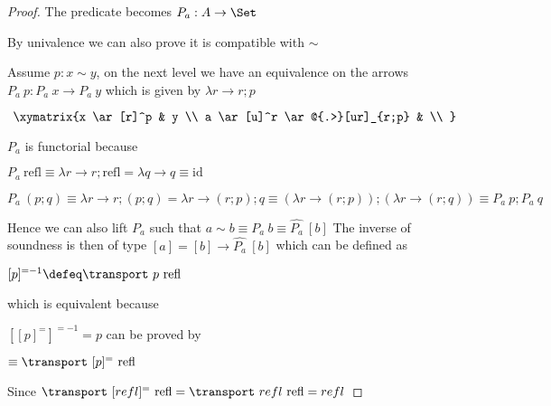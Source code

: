 \begin{proof}

The predicate becomes $P_a : A \to \Set$

By univalence we can also prove it is compatible with $\sim$


Assume $p : x \sim y$, on the next level we have an equivalence on the arrows
$P_a ~ p : P_a ~x  \to P_a ~ y$ which is given by $\lambda r \to r ; p$

\begin{displaymath}
    \xymatrix{x \ar[r]^p & y \\
      a \ar[u]^r \ar@{.>}[ur]_{r;p} & \\ }
\end{displaymath}


$P_a$ is functorial because

$P_a ~ \text{refl} \equiv \lambda r \to r ; \text{refl} = \lambda q \to q \equiv \text{id} $

$P_a ~ (p ; q) \equiv \lambda r \to r ; (p ; q) = \lambda r \to (r ; p) ; q \equiv (\lambda r \to (r ; p)) ; (\lambda r \to (r ; q)) \equiv P_a ~ p ; P_a ~ q$



Hence we can also lift $P_a$ such that $a \sim b \equiv P_a ~ b \equiv \hat{P_a} ~ [ b ]$
The inverse of soundness is then of type $[a]=[b] \to \hat{P_a} ~ [ b ]$ which can be defined as

$[ p ]^{=-1} \defeq \transport ~p ~ \text{refl}$


which is equivalent because

$[ [p]^{=} ]^{=-1} = p$ can be proved by

$\equiv \transport ~ [p]^{=} ~ \text{refl}$

Since $\transport ~ [refl]^{=} ~ \text{refl} = \transport ~ refl ~ \text{refl} = refl$






\end{proof}
